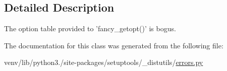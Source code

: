 \subsection{Detailed Description}
\begin{DoxyVerb}The option table provided to 'fancy_getopt()' is bogus.\end{DoxyVerb}
 

The documentation for this class was generated from the following file\+:\begin{DoxyCompactItemize}
\item 
venv/lib/python3./site-\/packages/setuptools/\+\_\+distutils/\hyperlink{__distutils_2errors_8py}{errors.\+py}\end{DoxyCompactItemize}

